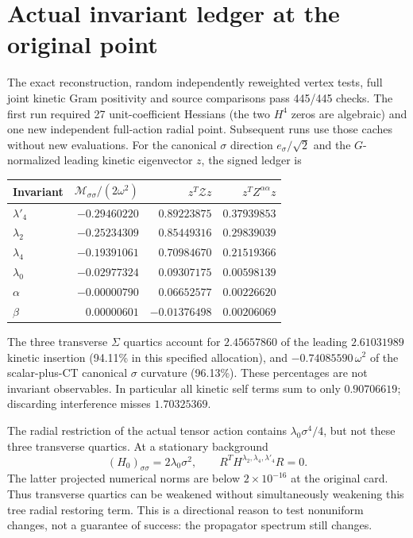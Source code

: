 \documentclass[11pt]{article}
\begin{document}
\section{Actual invariant ledger at the original point}
The exact reconstruction, random independently reweighted vertex tests,
full joint kinetic Gram positivity and source comparisons pass 445/445
checks. The first run required 27 unit-coefficient Hessians (the two
$H^4$ zeros are algebraic) and one new independent full-action radial
point. Subsequent runs use those caches without new evaluations.
For the canonical $\sigma$ direction $e_\sigma/\sqrt2$ and the
$G$-normalized leading kinetic eigenvector $z$, the signed ledger is
\begin{center}
\begin{tabular}{lrrr}
\toprule Invariant & $\mathscr M_{\sigma\sigma}/(2\omega^2)$ &
$z^T\mathscr Z z$ & $z^TZ^{\alpha\alpha}z$\\\midrule
$\lambda'_4$ & $-0.29460220$ & $0.89223875$ & $0.37939853$\\
$\lambda_2$ & $-0.25234309$ & $0.85449316$ & $0.29839039$\\
$\lambda_4$ & $-0.19391061$ & $0.70984670$ & $0.21519366$\\
$\lambda_0$ & $-0.02977324$ & $0.09307175$ & $0.00598139$\\
$\alpha$ & $-0.00000790$ & $0.06652577$ & $0.00226620$\\
$\beta$ & $0.00000601$ & $-0.01376498$ & $0.00206069$\\\bottomrule
\end{tabular}
\end{center}
The three transverse $\Sigma$ quartics account for $2.45657860$ of
the leading $2.61031989$ kinetic insertion (94.11\% in this specified
allocation), and $-0.74085590\,\omega^2$ of the scalar-plus-CT canonical
$\sigma$ curvature (96.13\%). These percentages are not invariant
observables. In particular all kinetic self terms sum to only
$0.90706619$; discarding interference misses $1.70325369$.

The radial restriction of the actual tensor action contains
$\lambda_0\sigma^4/4$, but not these three transverse quartics.
At a stationary background
\begin{equation}
 (H_0)_{\sigma\sigma}=2\lambda_0\sigma^2,
 \qquad R^TH^{\lambda_2,\lambda_4,\lambda'_4}R=0.
\end{equation}
The latter projected numerical norms are below $2\times10^{-16}$ at
the original card. Thus transverse quartics can be weakened without
simultaneously weakening this tree radial restoring term. This is a
directional reason to test nonuniform changes, not a guarantee of
success: the propagator spectrum still changes.
\end{document}
